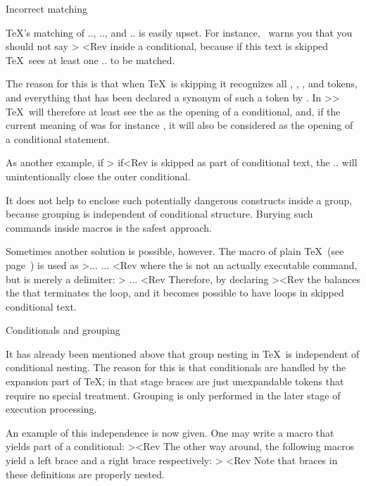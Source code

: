 {\spoint Incorrect matching

\TeX's matching of \ver.\if., \ver.\else., and \ver.\fi.
is easily upset. For instance, \TeXbook\ warns you that
you should not say \Ver> \let\ifabc=\iftrue<Rev inside a 
conditional, because if this text is skipped \TeX\ sees
at least one \ver.\if. to be matched. 

The reason for this is that when \TeX\ is skipping
it recognizes all , , , and 
tokens, and everything that has been declared a synonym of
such a token by . In \ver>\let\ifabc=\iftrue>
\TeX\ will therefore at least see the  as
the opening of a conditional, and, if the current meaning
of  was for instance , it will also
be considered as the opening of a conditional statement.

As another example, if
\Ver> \csname if\sometest\endcsname \someaction \fi<Rev
is skipped as part of conditional text,
the \ver.\fi. will unintentionally close the
outer conditional.

It does not help to enclose such potentially dangerous
constructs inside a group, because grouping is independent of
conditional structure. Burying such commands inside macros is
the safest approach.

Sometimes another solution is possible, however.
The  macro of plain \TeX\ (see page~\pgref[loop:ex])
is used as \Ver>\loop ... \if ... \repeat<Rev
where the  is not an actually executable
command, but is merely a delimiter:
\Ver>\def\loop#1\repeat{ ... }<Rev
Therefore,
by declaring \Ver>\let\repeat\fi<Rev
the  balances the  that terminates
the loop, and it becomes possible to have loops in
skipped conditional text.

\spoint Conditionals and grouping

It has already been mentioned above that group nesting in \TeX\
is independent of conditional nesting.
The reason for this is that conditionals are handled by the
expansion part of \TeX; in that stage braces are just
unexpandable tokens that require no special treatment.
Grouping is only performed in the later stage of execution
processing.

An example of this independence is now given.
One may write a macro that yields part of
a conditional:
\Ver>\def\elsepart{\else \dosomething \fi}<Rev
The other way around, the following macros
yield a left brace and a right brace respectively:
\Ver>\def\leftbrace{\iftrue{\else}\fi}
\def\rightbrace{\iffalse{\else}\fi}<Rev
Note that braces in these definitions are properly nested.

}
